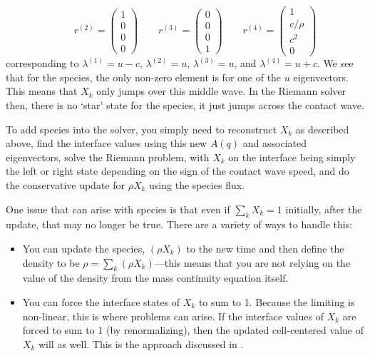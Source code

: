 \documentclass[11pt]{article}
\begin{document}
\begin{itemize}
\begin{equation}
%
\qquad
r^{(2)} = \left ( \begin{array}{c} 1 \\ 0 \\ 0  \\ 0\end{array} \right )
%
\qquad
r^{(3)} = \left ( \begin{array}{c} 0 \\ 0  \\ 0 \\ 1 \end{array} \right )
%
\qquad
r^{(4)} = \left ( \begin{array}{c} 1 \\ c/\rho \\ c^2 \\ 0 \end{array} \right )
\end{equation}
corresponding to $\lambda^{(1)} = u -c$, $\lambda^{(2)} = u$,
$\lambda^{(3)} = u$, and $\lambda^{(4)} = u + c$.  We see that for the
species, the only non-zero element is for one of the $u$ eigenvectors.
This means that $X_k$ only jumps over this middle wave.  In the
Riemann solver then, there is no `star' state for the species, it just
jumps across the contact wave.

To add species into the solver, you simply need to reconstruct $X_k$
as described above, find the interface values using this new $A(q)$
and associated eigenvectors, solve the Riemann problem, with $X_k$ on
the interface being simply the left or right state depending on the
sign of the contact wave speed, and do the conservative update for
$\rho X_k$ using the species flux.

One issue that can arise with species is that even if $\sum_k X_k = 1$
initially, after the update, that may no longer be true.  There are a 
variety of ways to handle this:
\begin{itemize}
\item You can update the species, $(\rho X_k)$ to the new time and then
define the density to be $\rho = \sum_k (\rho X_k)$---this means that
you are not relying on the value of the density from the mass continuity
equation itself.  

\item You can force the interface states of $X_k$ to sum to 1.  Because
the limiting is non-linear, this is where problems can arise.  If the 
interface values of $X_k$ are forced to sum to 1 (by renormalizing), then
the updated cell-centered value of $X_k$ will as well.  This is the
approach discussed in \cite{plewamuller:1999}.


\end{itemize}
\end{itemize}
\end{document}
